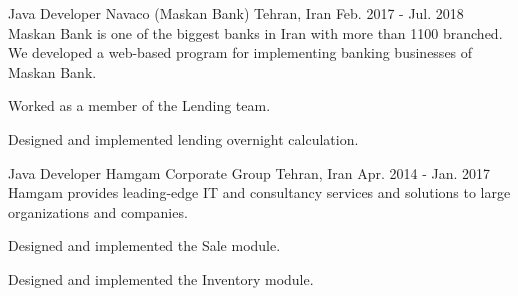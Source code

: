 \begin{cventries}
  \cventry
    {Java Developer} %
    {Navaco (Maskan Bank)} %
    {Tehran, Iran} %
    {Feb. 2017 - Jul. 2018} %
    {
      Maskan Bank is one of the biggest banks in Iran with more than 1100 branched.
      We developed a web-based program for implementing banking businesses of Maskan Bank.
    }
    {
      \begin{cvitems} %
        \item {Worked as a member of the Lending team.}
        \item {Designed and implemented lending overnight calculation.}
      \end{cvitems}
    }

  \cventry
    {Java Developer} %
    {Hamgam Corporate Group} %
    {Tehran, Iran} %
    {Apr. 2014 - Jan. 2017} %
    {
      Hamgam provides leading-edge IT and consultancy services and solutions to large organizations and companies.
    }
    {
      \begin{cvitems} %
        \item {Designed and implemented the Sale module.}
        \item {Designed and implemented the Inventory module.}
      \end{cvitems}
    }

\end{cventries}
